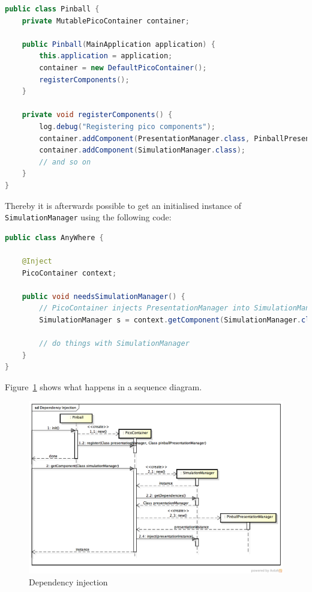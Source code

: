 \documentclass[fontsize=12pt,
               paper=a4,
               twoside=false,
               parskip=half,
               ]{scrartcl}
\begin{document}
\begin{minipage}[]{\linewidth}
\begin{lstlisting}[language=Java,label=lst:dependency_injection,caption={dependency injection}]
public class Pinball {
	private MutablePicoContainer container;

	public Pinball(MainApplication application) {
		this.application = application;
		container = new DefaultPicoContainer();
		registerComponents();
	}

	private void registerComponents() {
		log.debug("Registering pico components");
		container.addComponent(PresentationManager.class, PinballPresentationManager.class);
		container.addComponent(SimulationManager.class);
		// and so on
	}
}
\end{lstlisting}
\end{minipage}

Thereby it is afterwards possible to get an initialised instance of \texttt{SimulationManager} using the following code:

\begin{minipage}[]{\linewidth}
\begin{lstlisting}[language=Java,label=lst:get_initialised_component,caption={get initialised component}]
public class AnyWhere {
	
	@Inject
	PicoContainer context;

	public void needsSimulationManager() {
		// PicoContainer injects PresentationManager into SimulationManager
		SimulationManager s = context.getComponent(SimulationManager.class);

		// do things with SimulationManager
	}
}
\end{lstlisting}
\end{minipage}

Figure~\ref{fig:dependency_injection3} shows what happens in a sequence diagram.

\begin{figure}[H]
	\centering
	\includegraphics[width=15.5cm]{./img/dependency-injection-sd.png}
	\caption[Dependency injection]{Dependency injection}
	\label{fig:dependency_injection3}
\end{figure}
\end{document}
